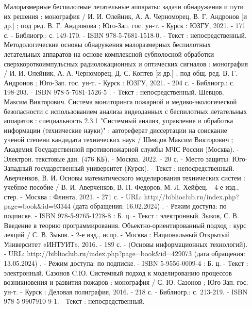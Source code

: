 \begin{thebibliography}{50}
    \bibitem{} Малоразмерные беспилотные летательные аппараты: задачи обнаружения и пути их решения : монография / И. И. Олейник, А. А. Черноморец, В. Г. Андронов [и др.] ; под ред. В. Г. Андронова ; Юго-Зап. гос. ун-т. - Курск : ЮЗГУ, 2021. - 171 с. - Библиогр.: с. 149-170. - ISBN 978-5-7681-1518-0. - Текст : непосредственный.
    \bibitem{} Методологические основы обнаружения малоразмерных беспилотных летательных аппаратов на основе комплексной субполосной обработки сверхкороткоимпульсных радиолокационных и оптических сигналов : монография / И. И. Олейник, А. А. Черноморец, Д. С. Коптев [и др.] ; под общ. ред. В. Г. Андронов ; Юго-Зап. гос. ун-т. - Курск : ЮЗГУ, 2021. - 204 с. - Библиогр.: с. 198-203. - ISBN 978-5-7681-1526-5 . - Текст : непосредственный.
    \bibitem{} Шевцов, Максим Викторович.   Система мониторинга пожарной и медико-экологической безопасности с использованием анализа видеоданных с беспилотных летательных аппаратов : специальность 2.3.1 "Системный анализ, управление и обработка информации (технические науки)" : автореферат диссертации на соискание ученой степени кандидата технических наук / Шевцов Максим Викторович ; Академия Государственной противопожарной службы МЧС России (Москва). - Электрон. текстовые дан. (476 КБ). - Москва, 2022. - 20 с. - Место защиты: Юго-Западный государственный университет (Курск). - Текст : непосредственный.
    \bibitem{} Аверченков, В. И.    Основы математического моделирования технических систем : учебное пособие / В. И. Аверченков, В. П. Федоров, М. Л. Хейфец. - 4-е изд., стер. - Москва : Флинта, 2021. - 271 с. - URL: http://biblioclub.ru/index.php?page=book\&id=93344 (дата обращения: 16.02.2024) . - Режим доступа: по подписке. - ISBN 978-5-9765-1278-8 : Б. ц. - Текст : электронный.
    \bibitem{} Зыков, С. В.    Введение в теорию программирования. Объектно-ориентированный подход : курс лекций / С. В. Зыков. - 2-е изд., испр. - Москва : Национальный Открытый Университет «ИНТУИТ», 2016. - 189 с. - (Основы информационных технологий). - URL: http://biblioclub.ru/index.php?page=book\&id=429073 (дата обращения: 13.05.2024) . - Режим доступа: по подписке. - ISBN 5-9556-0009-4 : Б. ц. - Текст : электронный.
    \bibitem{} Сазонов C.Ю.    Системный подход к моделированию процессов возникновения и развития пожаров : монография / С. Ю. Сазонов ; Юго-Зап. гос. ун-т. - Курск : Деловая полиграфия, 2016. - 218 с. - Библиогр.: с. 213-219. - ISBN 978-5-9907910-9-1. - Текст : непосредственный.
\end{thebibliography}
